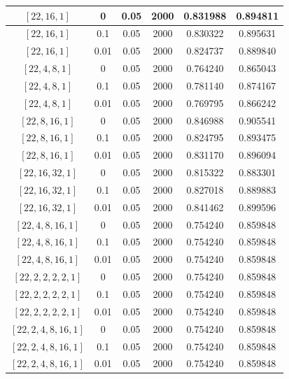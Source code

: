 \documentclass{article}
\begin{document}
\begin{enumerate}
\begin{table}[H]
\begin{tabular}{|c|c|c|c|c|c|}
$[22, 16, 1]$ & 0    & 0.05 & 2000 & 0.831988 & 0.894811 \\ \hline
$[22, 16, 1]$ & 0.1  & 0.05 & 2000 & 0.830322 & 0.895631 \\ \hline
$[22, 16, 1]$ & 0.01 & 0.05 & 2000 & 0.824737 & 0.889840 \\ \hline

$[22, 4, 8, 1]$ & 0    & 0.05 & 2000 & 0.764240 & 0.865043 \\ \hline
$[22, 4, 8, 1]$ & 0.1  & 0.05 & 2000 & 0.781140 & 0.874167 \\ \hline
$[22, 4, 8, 1]$ & 0.01 & 0.05 & 2000 & 0.769795 & 0.866242 \\ \hline

$[22, 8, 16, 1]$ & 0    & 0.05 & 2000 & 0.846988 & 0.905541 \\ \hline
$[22, 8, 16, 1]$ & 0.1  & 0.05 & 2000 & 0.824795 & 0.893475 \\ \hline
$[22, 8, 16, 1]$ & 0.01 & 0.05 & 2000 & 0.831170 & 0.896094 \\ \hline

$[22, 16, 32, 1]$ & 0    & 0.05 & 2000 & 0.815322 & 0.883301 \\ \hline
$[22, 16, 32, 1]$ & 0.1  & 0.05 & 2000 & 0.827018 & 0.889883 \\ \hline
$[22, 16, 32, 1]$ & 0.01 & 0.05 & 2000 & 0.841462 & 0.899596 \\ \hline

$[22, 4, 8, 16, 1]$ & 0    & 0.05 & 2000 & 0.754240 & 0.859848 \\ \hline
$[22, 4, 8, 16, 1]$ & 0.1  & 0.05 & 2000 & 0.754240 & 0.859848 \\ \hline
$[22, 4, 8, 16, 1]$ & 0.01 & 0.05 & 2000 & 0.754240 & 0.859848 \\ \hline

$[22, 2, 2, 2, 2, 1]$ & 0    & 0.05 & 2000 & 0.754240 & 0.859848 \\ \hline
$[22, 2, 2, 2, 2, 1]$ & 0.1  & 0.05 & 2000 & 0.754240 & 0.859848 \\ \hline
$[22, 2, 2, 2, 2, 1]$ & 0.01 & 0.05 & 2000 & 0.754240 & 0.859848 \\ \hline

$[22, 2, 4, 8, 16, 1]$ & 0    & 0.05 & 2000 & 0.754240 & 0.859848 \\ \hline
$[22, 2, 4, 8, 16, 1]$ & 0.1  & 0.05 & 2000 & 0.754240 & 0.859848 \\ \hline
$[22, 2, 4, 8, 16, 1]$ & 0.01 & 0.05 & 2000 & 0.754240 & 0.859848 \\ \hline


\end{tabular}
\end{table}
\end{enumerate}
\end{document}
